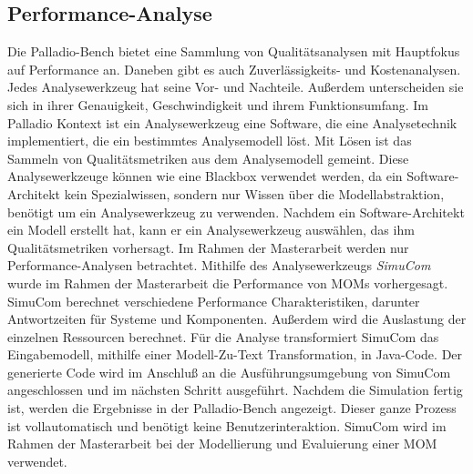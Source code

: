\subsection{Performance-Analyse}
Die Palladio-Bench bietet eine Sammlung von Qualitätsanalysen mit Hauptfokus auf Performance an. Daneben gibt es auch Zuverlässigkeits- und Kostenanalysen. Jedes Analysewerkzeug hat seine Vor- und Nachteile. Außerdem unterscheiden sie sich in ihrer Genauigkeit, Geschwindigkeit und ihrem Funktionsumfang. Im Palladio Kontext ist ein Analysewerkzeug eine Software, die eine Analysetechnik implementiert, die ein bestimmtes Analysemodell löst. Mit Lösen ist das Sammeln von Qualitätsmetriken aus dem Analysemodell gemeint. Diese Analysewerkzeuge können wie eine Blackbox verwendet werden, da ein Software-Architekt kein Spezialwissen, sondern nur Wissen über die Modellabstraktion, benötigt um ein Analysewerkzeug zu verwenden. Nachdem ein Software-Architekt ein Modell erstellt hat, kann er ein Analysewerkzeug auswählen, das ihm Qualitätsmetriken vorhersagt. Im Rahmen der Masterarbeit werden nur Performance-Analysen betrachtet.  Mithilfe des Analysewerkzeugs \emph{SimuCom} \cite{simucom} wurde im Rahmen der Masterarbeit die Performance von MOMs vorhergesagt. SimuCom berechnet verschiedene Performance Charakteristiken, darunter Antwortzeiten für Systeme und Komponenten. Außerdem wird die Auslastung der einzelnen Ressourcen berechnet. Für die Analyse transformiert SimuCom das Eingabemodell, mithilfe einer Modell-Zu-Text Transformation, in Java-Code. Der generierte Code wird im Anschluß an die Ausführungsumgebung von SimuCom angeschlossen und im nächsten Schritt ausgeführt. Nachdem die Simulation fertig ist, werden die Ergebnisse in der Palladio-Bench angezeigt. Dieser ganze Prozess ist vollautomatisch und benötigt keine Benutzerinteraktion. SimuCom wird im Rahmen der Masterarbeit bei der Modellierung und Evaluierung einer MOM verwendet.

